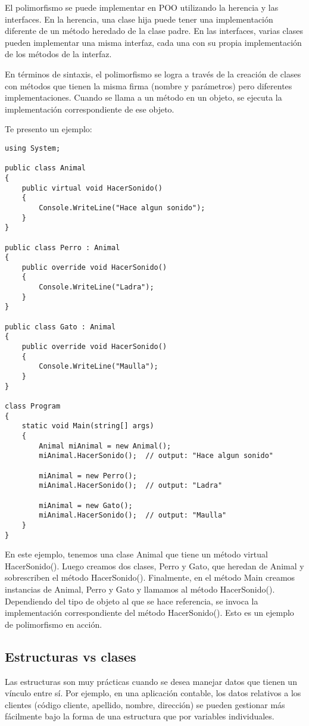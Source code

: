 \documentclass[executivepaper]{article}
\begin{document}
El polimorfismo se puede implementar en POO utilizando la herencia y las interfaces. En la herencia, una clase hija puede tener una implementación diferente de un método heredado de la clase padre. En las interfaces, varias clases pueden implementar una misma interfaz, cada una con su propia implementación de los métodos de la interfaz.

En términos de sintaxis, el polimorfismo se logra a través de la creación de clases con métodos que tienen la misma firma (nombre y parámetros) pero diferentes implementaciones. Cuando se llama a un método en un objeto, se ejecuta la implementación correspondiente de ese objeto.

Te presento un ejemplo:
\begin{lstlisting}
using System;

public class Animal
{
    public virtual void HacerSonido()
    {
        Console.WriteLine("Hace algun sonido");
    }
}

public class Perro : Animal
{
    public override void HacerSonido()
    {
        Console.WriteLine("Ladra");
    }
}

public class Gato : Animal
{
    public override void HacerSonido()
    {
        Console.WriteLine("Maulla");
    }
}

class Program
{
    static void Main(string[] args)
    {
        Animal miAnimal = new Animal();
        miAnimal.HacerSonido();  // output: "Hace algun sonido"

        miAnimal = new Perro();
        miAnimal.HacerSonido();  // output: "Ladra"

        miAnimal = new Gato();
        miAnimal.HacerSonido();  // output: "Maulla"
    }
}
\end{lstlisting}

En este ejemplo, tenemos una clase Animal que tiene un método virtual HacerSonido(). Luego creamos dos clases, Perro y Gato, que heredan de Animal y sobrescriben el método HacerSonido(). Finalmente, en el método Main creamos instancias de Animal, Perro y Gato y llamamos al método HacerSonido(). Dependiendo del tipo de objeto al que se hace referencia, se invoca la implementación correspondiente del método HacerSonido(). Esto es un ejemplo de polimorfismo en acción.

\subsection*{Estructuras vs clases}

Las estructuras son muy prácticas cuando se desea manejar datos que tienen un vínculo entre sí. Por ejemplo, en una aplicación contable, los datos relativos a los clientes (código cliente, apellido, nombre, dirección) se pueden gestionar más fácilmente bajo la forma de una estructura que por variables individuales.
\end{document}
